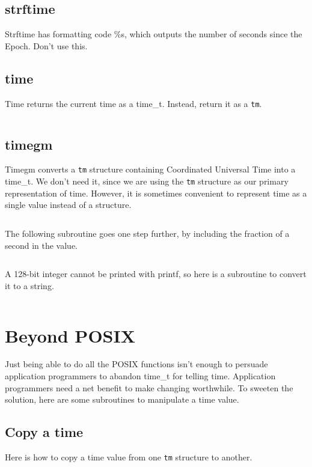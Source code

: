 \documentclass[letterpaper,twoside]{article}
\begin{document}
\subsection{strftime}
Strftime has formatting code \%s, which outputs the number of seconds
since the Epoch.  Don't use this.

\subsection{time}
Time returns the current time as a {\ttfamily time\_t}.
Instead, return it as a \verb|tm|.
\inputminted[firstline=34]{c}{time_current_tm.c}

\subsection{timegm}
Timegm converts a \verb|tm| structure containing Coordinated Universal Time
into a {\ttfamily time\_t}.
We don't need it, since we are using the \verb|tm| structure
as our primary representation of time.  However, it is sometimes
convenient to represent time as a single value instead of a structure.
\inputminted[firstline=32]{c}{time_tm_to_integer.c}

The following subroutine goes one step further, by including the
fraction of a second in the value.
\inputminted[firstline=32]{c}{time_tm_nano_to_integer.c}

A 128-bit integer cannot be printed with printf, so here is a subroutine
to convert it to a string.
\inputminted[firstline=32]{c}{int128_to_string.c}

\section{Beyond POSIX}
Just being able to do all the POSIX functions isn't enough to persuade
application programmers to abandon {\ttfamily time\_t} for telling time.
Application programmers
need a net benefit to make changing worthwhile.  To sweeten the solution,
here are some subroutines to manipulate a time value.

\subsection{Copy a time}
\label{subsection:copy}
Here is how to copy a time value from one \verb|tm| structure to another.
\inputminted[firstline=34]{c}{time_copy.c}
\end{document}

